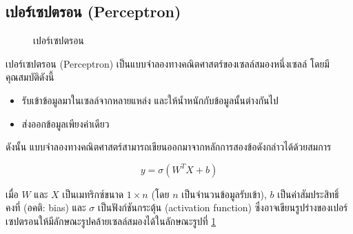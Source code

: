 \documentclass{cpereport}
\begin{document}
\subsection{เปอร์เซปตรอน (Perceptron)}
\begin{figure}
    \centering
    \caption{เปอร์เซปตรอน}
    \label{tikz-perceptron}
\end{figure}
เปอร์เซปตรอน (Perceptron) \cite{rosenblatt_1958} เป็นแบบจำลองทางคณิตศาสตร์ของเซลล์สมองหนึ่งเซลล์ โดยมีคุณสมบัติดังนี้

\begin{itemize}
    \item รับเข้าข้อมูลมาในเซลล์จากหลายแหล่ง และให้น้ำหนักกับข้อมูลนั้นต่างกันไป
    \item ส่งออกข้อมูลเพียงค่าเดียว
\end{itemize}

ดังนั้น แบบจำลองทางคณิตศาสตร์สามารถเขียนออกมาจากหลักการสองข้อดังกล่าวได้ด้วยสมการ

\begin{equation}
y = \sigma\left(W^TX+b\right)
\end{equation}

เมื่อ $W$ และ $X$ เป็นเมทริกซ์ขนาด $1 \times n$ (โดย $n$ เป็นจำนวนข้อมูลรับเข้า), $b$ เป็นค่าสัมประสิทธิ์คงที่ (อคติ: bias)
และ $\sigma$ เป็นฟังก์ชันกระตุ้น (activation function) ซึ่งอาจเขียนรูปร่างของเปอร์เซปตรอนให้มีลักษณะรูปคล้ายเซลล์สมองได้ในลักษณะรูปที่ \ref{tikz-perceptron}
\end{document}
